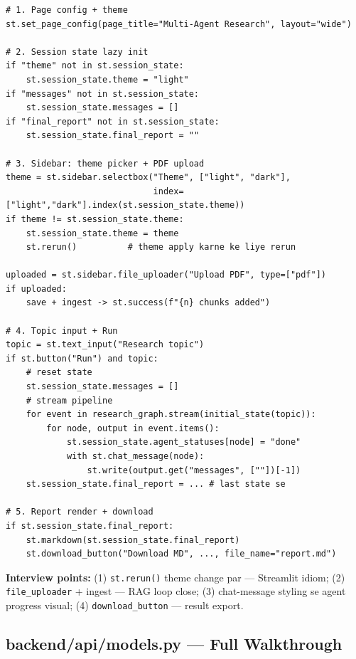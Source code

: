 \begin{codestorybox}
\begin{lstlisting}[style=pythonstyle, caption={app.py --- key flow}]
# 1. Page config + theme
st.set_page_config(page_title="Multi-Agent Research", layout="wide")

# 2. Session state lazy init
if "theme" not in st.session_state:
    st.session_state.theme = "light"
if "messages" not in st.session_state:
    st.session_state.messages = []
if "final_report" not in st.session_state:
    st.session_state.final_report = ""

# 3. Sidebar: theme picker + PDF upload
theme = st.sidebar.selectbox("Theme", ["light", "dark"],
                             index=["light","dark"].index(st.session_state.theme))
if theme != st.session_state.theme:
    st.session_state.theme = theme
    st.rerun()          # theme apply karne ke liye rerun

uploaded = st.sidebar.file_uploader("Upload PDF", type=["pdf"])
if uploaded:
    save + ingest -> st.success(f"{n} chunks added")

# 4. Topic input + Run
topic = st.text_input("Research topic")
if st.button("Run") and topic:
    # reset state
    st.session_state.messages = []
    # stream pipeline
    for event in research_graph.stream(initial_state(topic)):
        for node, output in event.items():
            st.session_state.agent_statuses[node] = "done"
            with st.chat_message(node):
                st.write(output.get("messages", [""])[-1])
    st.session_state.final_report = ... # last state se

# 5. Report render + download
if st.session_state.final_report:
    st.markdown(st.session_state.final_report)
    st.download_button("Download MD", ..., file_name="report.md")
\end{lstlisting}

\textbf{Interview points:} (1) \texttt{st.rerun()} theme change par --- Streamlit idiom; (2) \texttt{file\_uploader} + ingest --- RAG loop close; (3) chat-message styling se agent progress visual; (4) \texttt{download\_button} --- result export.
\end{codestorybox}

\subsection{backend/api/models.py --- Full Walkthrough}

